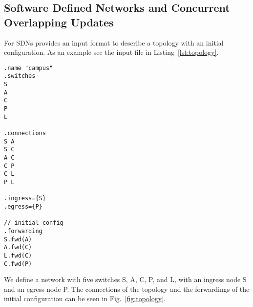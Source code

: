 \documentclass[12pt,twoside,a4paper,openright]{memoir}
\begin{document}
\subsection{Software Defined Networks and Concurrent Overlapping Updates}
For SDNs \tool{} provides an input format to describe a topology with an
initial configuration. As an example see the input file in Listing~\ref{lst:topology}.
\begin{lstlisting}[captionpos=b, caption=Example for a topology and inital configuration of an SDN., label = lst:topology,language=sdn-format]
.name "campus"
.switches
S
A
C
P
L
 
.connections
S A
S C
A C
C P
C L
P L

.ingress={S}
.egress={P}

// initial config
.forwarding
S.fwd(A)
A.fwd(C)
L.fwd(C)
C.fwd(P)
\end{lstlisting}
We define a network with five switches S, A, C, P, and L,
with an ingress node S and an egress node P.
The connections of the topology and the forwardings of the initial configuration can be seen in Fig.~\ref{fig:topology}.
%
\end{document}
